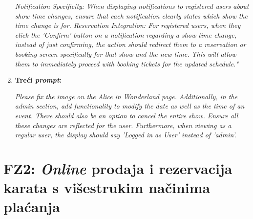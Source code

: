 \begin{enumerate}
            \textit{Notification Specificity: When displaying notifications to registered users about show time changes, ensure that each notification clearly states which show the time change is for.
            Reservation Integration: For registered users, when they click the 'Confirm' button on a notification regarding a show time change, instead of just confirming, the action should redirect them to a reservation or booking screen specifically for that show and the new time. This will allow them to immediately proceed with booking tickets for the updated schedule."}


  
            \item \textbf{Treći \textit{prompt}:}
            
            \textit{Please fix the image on the Alice in Wonderland page. Additionally, in the admin section, add functionality to modify the date as well as the time of an event. There should also be an option to cancel the entire show. Ensure all these changes are reflected for the user. Furthermore, when viewing as a regular user, the display should say 'Logged in as User' instead of 'admin'.}
        \end{enumerate}

\sloppy  
\section{FZ2: \textit{Online} prodaja i rezervacija karata s višestrukim načinima plaćanja}  



\sloppy  

